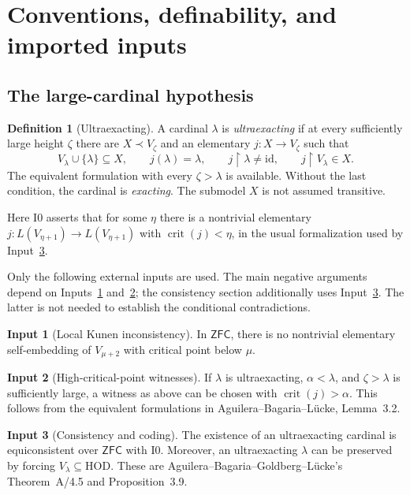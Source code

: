\documentclass[11pt,letterpaper]{article}
\theoremstyle{definition}
\newtheorem{definition}{Definition}[section]
\newtheorem{inputthm}{Input}
\numberwithin{equation}{section}
\newcommand{\ZFC}{\mathsf{ZFC}}
\newcommand{\HOD}{\mathrm{HOD}}
\newcommand{\crit}{\operatorname{crit}}
\newcommand{\id}{\mathrm{id}}
\newcommand{\restr}{\mathbin{\upharpoonright}}
\newcommand{\Izero}{\mathrm{I0}}
\begin{document}
\section{Conventions, definability, and imported inputs}\label{sec:conventions}

\subsection{The large-cardinal hypothesis}

\begin{definition}[Ultraexacting]
A cardinal $\lambda$ is \emph{ultraexacting} if at every sufficiently large height $\zeta$ there are $X\prec V_\zeta$ and an elementary $j:X\to V_\zeta$ such that
\[
V_\lambda\cup\{\lambda\}\subseteq X,\qquad
j(\lambda)=\lambda,\qquad
j\restr\lambda\ne\id,\qquad
j\restr V_\lambda\in X.
\]
The equivalent formulation with every $\zeta>\lambda$ is available. Without the last condition, the cardinal is \emph{exacting}. The submodel $X$ is not assumed transitive. \cite[Definitions~2.4, 3.3]{abl}
\end{definition}

Here $\Izero$ asserts that for some $\eta$ there is a nontrivial elementary $j:L(V_{\eta+1})\to L(V_{\eta+1})$ with $\crit(j)<\eta$, in the usual formalization used by Input~\ref{in:i0}.

Only the following external inputs are used. The main negative arguments depend on Inputs~\ref{in:k} and~\ref{in:high}; the consistency section additionally uses Input~\ref{in:i0}. The latter is not needed to establish the conditional contradictions.

\begin{inputthm}[Local Kunen inconsistency]\label{in:k}
In $\ZFC$, there is no nontrivial elementary self-embedding of $V_{\mu+2}$ with critical point below $\mu$. \cite{kunen,hkp}
\end{inputthm}

\begin{inputthm}[High-critical-point witnesses]\label{in:high}
If $\lambda$ is ultraexacting, $\alpha<\lambda$, and $\zeta>\lambda$ is sufficiently large, a witness as above can be chosen with $\crit(j)>\alpha$. This follows from the equivalent formulations in Aguilera--Bagaria--L\"ucke, Lemma~3.2. \cite{abl}
\end{inputthm}

\begin{inputthm}[Consistency and coding]\label{in:i0}
The existence of an ultraexacting cardinal is equiconsistent over $\ZFC$ with $\Izero$. Moreover, an ultraexacting $\lambda$ can be preserved by forcing $V_\lambda\subseteq\HOD$. These are Aguilera--Bagaria--Goldberg--L\"ucke's Theorem~A/4.5 and Proposition~3.9. \cite{abgl}
\end{inputthm}
\end{document}
